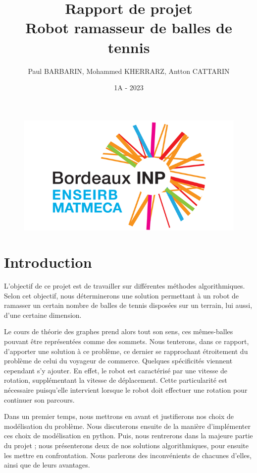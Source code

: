 \documentclass[12pt]{article}
\title{Rapport de projet \\ \textbf{Robot ramasseur de balles de tennis}}
\author{Paul BARBARIN, Mohammed KHERRARZ, Antton CATTARIN}
\date{1A - 2023}
\begin{document}
    \begin{titlepage}

        \begin{figure}
            \centering
            \includegraphics{img/enseirb}
        \end{figure}
        \maketitle

    \end{titlepage}

    \tableofcontents
    \pagebreak
    
    \section{Introduction}
    \label{sec:intro}

    L'objectif de ce projet est de travailler sur différentes méthodes algorithmiques. Selon cet objectif, nous déterminerons une solution permettant à un robot de ramasser un certain nombre de balles de tennis disposées sur un terrain, lui aussi, d'une certaine dimension.

    Le cours de théorie des graphes prend alors tout son sens, ces mêmes-balles pouvant être représentées comme des sommets. Nous tenterons, dans ce rapport, d'apporter une solution à ce problème, ce dernier se rapprochant étroitement du problème de celui du voyageur de commerce.
    Quelques spécificités viennent cependant s'y ajouter. En effet, le robot est caractérisé par une vitesse de rotation, supplémentant la vitesse de déplacement. Cette particularité est nécessaire puisqu'elle intervient lorsque le robot doit effectuer une rotation pour continuer son parcours.

    Dans un premier temps, nous mettrons en avant et justifierons nos choix de modélisation du problème. Nous discuterons ensuite de la manière d'implémenter ces choix de modélisation en python. Puis, nous rentrerons dans la majeure partie du projet ; nous présenterons deux de nos solutions algorithmiques, pour ensuite les mettre en confrontation. Nous parlerons des inconvénients de chacunes d'elles, ainsi que de leurs avantages.
\end{document}
